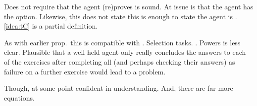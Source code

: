 \begin{note}
  Does not require that the agent (re)proves \sqE{} is sound.
  At issue is that the agent has the option.
  Likewise, this does not state this is enough to state the agent is \tCV{}.
  \autoref{idea:tC} is a partial definition.
\end{note}


\begin{note}
  As with earlier prop.\ this is compatible with \issueConstraint{}.
  Selection tasks.
  \sqE{}.
  Powers is less clear.
  Plausible that a well-held agent only really concludes the answers to each of the exercises after completing all (and perhaps checking their answers) as failure on a further exercise would lead to a problem.

  Though, at some point confident in understanding.
  And, there are far more equations.
\end{note}






